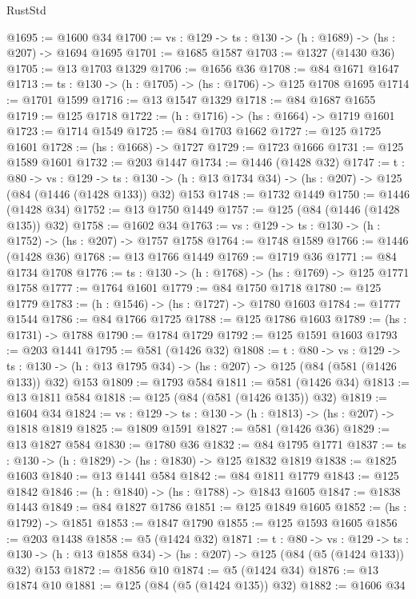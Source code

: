 \begin{lexlean}{RustStd}
\begin{coremodule}
@1695 := @1600 @34
@1700 := {vs : @129} -> {ts : @130} -> (h : @1689) -> (hs : @207) -> @1694 @1695
@1701 := @1685 @1587
@1703 := @1327 (@1430 @36)
@1705 := @13 @1703 @1329
@1706 := @1656 @36
@1708 := @84 @1671 @1647
@1713 := {ts : @130} -> (h : @1705) -> (hs : @1706) -> @125 @1708 @1695
@1714 := @1701 @1599
@1716 := @13 @1547 @1329
@1718 := @84 @1687 @1655
@1719 := @125 @1718
@1722 := (h : @1716) -> (hs : @1664) -> @1719 @1601
@1723 := @1714 @1549
@1725 := @84 @1703 @1662
@1727 := @125 @1725 @1601
@1728 := (hs : @1668) -> @1727
@1729 := @1723 @1666
@1731 := @125 @1589 @1601
@1732 := @203 @1447
@1734 := @1446 (@1428 @32)
@1747 := {t : @80} ->
  {vs : @129} ->
  {ts : @130} -> (h : @13 @1734 @34) -> (hs : @207) -> @125 (@84 (@1446 (@1428 @133)) @32) @153
@1748 := @1732 @1449
@1750 := @1446 (@1428 @34)
@1752 := @13 @1750 @1449
@1757 := @125 (@84 (@1446 (@1428 @135)) @32)
@1758 := @1602 @34
@1763 := {vs : @129} -> {ts : @130} -> (h : @1752) -> (hs : @207) -> @1757 @1758
@1764 := @1748 @1589
@1766 := @1446 (@1428 @36)
@1768 := @13 @1766 @1449
@1769 := @1719 @36
@1771 := @84 @1734 @1708
@1776 := {ts : @130} -> (h : @1768) -> (hs : @1769) -> @125 @1771 @1758
@1777 := @1764 @1601
@1779 := @84 @1750 @1718
@1780 := @125 @1779
@1783 := (h : @1546) -> (hs : @1727) -> @1780 @1603
@1784 := @1777 @1544
@1786 := @84 @1766 @1725
@1788 := @125 @1786 @1603
@1789 := (hs : @1731) -> @1788
@1790 := @1784 @1729
@1792 := @125 @1591 @1603
@1793 := @203 @1441
@1795 := @581 (@1426 @32)
@1808 := {t : @80} ->
  {vs : @129} ->
  {ts : @130} -> (h : @13 @1795 @34) -> (hs : @207) -> @125 (@84 (@581 (@1426 @133)) @32) @153
@1809 := @1793 @584
@1811 := @581 (@1426 @34)
@1813 := @13 @1811 @584
@1818 := @125 (@84 (@581 (@1426 @135)) @32)
@1819 := @1604 @34
@1824 := {vs : @129} -> {ts : @130} -> (h : @1813) -> (hs : @207) -> @1818 @1819
@1825 := @1809 @1591
@1827 := @581 (@1426 @36)
@1829 := @13 @1827 @584
@1830 := @1780 @36
@1832 := @84 @1795 @1771
@1837 := {ts : @130} -> (h : @1829) -> (hs : @1830) -> @125 @1832 @1819
@1838 := @1825 @1603
@1840 := @13 @1441 @584
@1842 := @84 @1811 @1779
@1843 := @125 @1842
@1846 := (h : @1840) -> (hs : @1788) -> @1843 @1605
@1847 := @1838 @1443
@1849 := @84 @1827 @1786
@1851 := @125 @1849 @1605
@1852 := (hs : @1792) -> @1851
@1853 := @1847 @1790
@1855 := @125 @1593 @1605
@1856 := @203 @1438
@1858 := @5 (@1424 @32)
@1871 := {t : @80} ->
  {vs : @129} ->
  {ts : @130} -> (h : @13 @1858 @34) -> (hs : @207) -> @125 (@84 (@5 (@1424 @133)) @32) @153
@1872 := @1856 @10
@1874 := @5 (@1424 @34)
@1876 := @13 @1874 @10
@1881 := @125 (@84 (@5 (@1424 @135)) @32)
@1882 := @1606 @34

\end{coremodule}
\end{lexlean}
